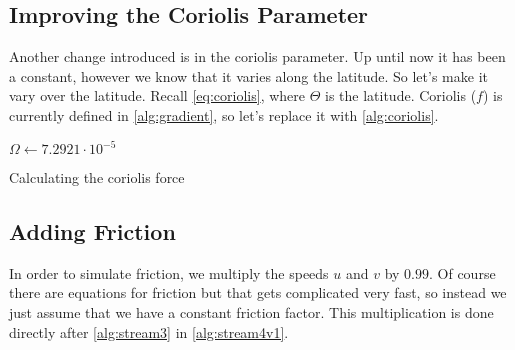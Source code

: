 \subsection{Improving the Coriolis Parameter}
Another change introduced is in the coriolis parameter. Up until now it has been a constant, however we know that it varies along the latitude. So let's make it vary over the latitude. Recall 
\autoref{eq:coriolis}, where $\Theta$ is the latitude. Coriolis ($f$) is currently defined in \autoref{alg:gradient}, so let's replace it with \autoref{alg:coriolis}.

\begin{algorithm}
    \SetAlgoLined
    $\Omega \leftarrow 7.2921 \cdot 10^{-5}$ \;

    \caption{Calculating the coriolis force}
    \label{alg:coriolis}
\end{algorithm}

\subsection{Adding Friction}
In order to simulate friction, we multiply the speeds $u$ and $v$ by $0.99$. Of course there are equations for friction but that gets complicated very fast, so instead we just assume that we
have a constant friction factor. This multiplication is done directly after \autoref{alg:stream3} in \autoref{alg:stream4v1}.